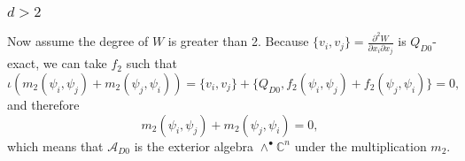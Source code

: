 \documentclass[a4paper,11pt]{article}
\def\cA{\mathcal{A}}
\numberwithin{equation}{section}
\begin{document}
\subsubsection{$d>2$}

Now assume the degree of $W$ is greater than 2. Because $\{ v_i, v_j \} = 
 \frac{\partial^2 W}{\partial x_i \partial x_j}$ is $Q_{D0}$-exact, we can 
take $f_2$ such that
\[
\iota (m_2(\psi_i,\psi_j) + m_2(\psi_j,\psi_i)) = \{ v_i,v_j \} + \{ Q_{D0}, 
f_2(\psi_i,\psi_j)+f_2(\psi_j,\psi_i) \} = 0,
\]
and therefore 
\begin{equation}\label{exterioralg}
m_2(\psi_i,\psi_j) + m_2(\psi_j,\psi_i) = 0,
\end{equation} 
which means that $\cA_{D0}$ is the exterior algebra $\wedge^\bullet \mathbb{C}^n$ under the multiplication $m_2$.
\end{document}
